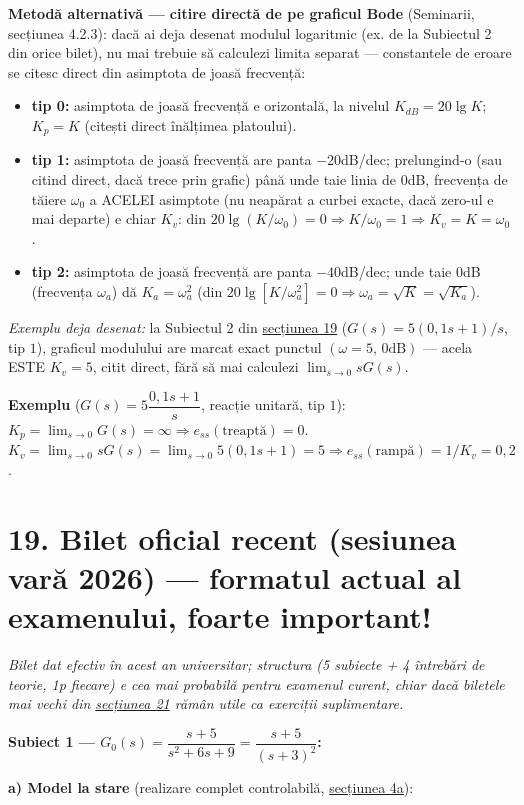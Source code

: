 \documentclass[10pt,a4paper]{article}
\newcommand{\tip}[1]{\textcolor{blue!55!black}{#1}}
\begin{document}
\tip{\textbf{Metodă alternativă — citire directă de pe graficul Bode} (Seminarii, secțiunea 4.2.3): dacă ai deja desenat modulul logaritmic (ex. de la Subiectul 2 din orice bilet), nu mai trebuie să calculezi limita separat — constantele de eroare se citesc direct din asimptota de joasă frecvență:
\begin{itemize}
\item \textbf{tip 0:} asimptota de joasă frecvență e orizontală, la nivelul $K_{dB}{=}20\lg K$; $K_p{=}K$ (citești direct înălțimea platoului).
\item \textbf{tip 1:} asimptota de joasă frecvență are panta $-20$dB/dec; prelungind-o (sau citind direct, dacă trece prin grafic) până unde taie linia de $0$dB, frecvența de tăiere $\omega_0$ a ACELEI asimptote (nu neapărat a curbei exacte, dacă zero-ul e mai departe) e chiar $K_v$: din $20\lg(K/\omega_0){=}0\Rightarrow K/\omega_0{=}1\Rightarrow K_v{=}K{=}\omega_0$.
\item \textbf{tip 2:} asimptota de joasă frecvență are panta $-40$dB/dec; unde taie $0$dB (frecvența $\omega_a$) dă $K_a{=}\omega_a^2$ (din $20\lg[K/\omega_a^2]{=}0\Rightarrow\omega_a{=}\sqrt K{=}\sqrt{K_a}$).
\end{itemize}}
\tip{\textit{Exemplu deja desenat:} la Subiectul 2 din \hyperref[sec:19]{secțiunea 19} ($G(s){=}5(0{,}1s{+}1)/s$, tip $1$), graficul modulului are marcat exact punctul $(\omega{=}5,\,0\text{dB})$ — acela ESTE $K_v{=}5$, citit direct, fără să mai calculezi $\lim_{s\to0}sG(s)$.}

\textbf{Exemplu} ($G(s)=5\dfrac{0{,}1s+1}{s}$, reacție unitară, tip $1$): $K_p=\lim_{s\to0}G(s)=\infty\Rightarrow e_{ss}(\text{treaptă})=0$. $K_v=\lim_{s\to0}sG(s)=\lim_{s\to0}5(0{,}1s+1)=5\Rightarrow e_{ss}(\text{rampă})=1/K_v=0{,}2$.

\section*{19. Bilet oficial recent (sesiunea vară 2026) — formatul actual al examenului, foarte important!}\label{sec:19}
\textit{Bilet dat efectiv în acest an universitar; structura (5 subiecte + 4 întrebări de teorie, 1p fiecare) e cea mai probabilă pentru examenul curent, chiar dacă biletele mai vechi din \hyperref[sec:21]{secțiunea 21} rămân utile ca exerciții suplimentare.}

\textbf{Subiect 1 — $G_0(s)=\dfrac{s+5}{s^2+6s+9}=\dfrac{s+5}{(s+3)^2}$:}

\textbf{a) Model la stare} (realizare complet controlabilă, \hyperref[sec:4]{secțiunea 4a}):
\end{document}

